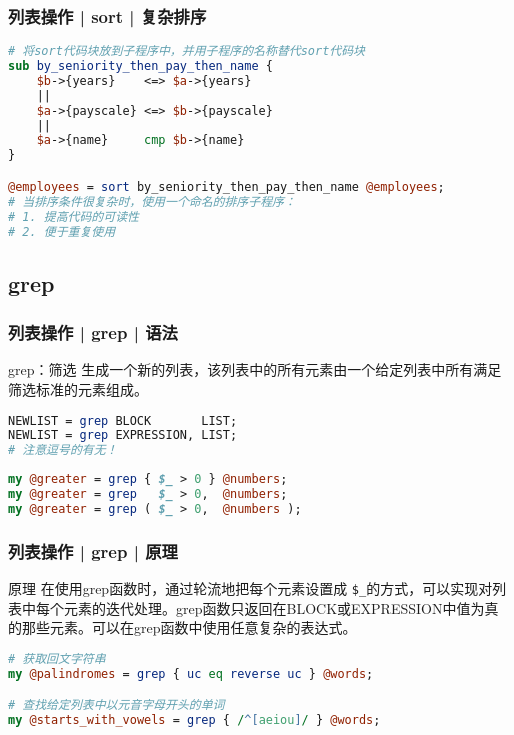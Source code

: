 \begin{frame}[fragile]
  \frametitle{列表操作 | sort | 复杂排序}
  \vspace{-1.5em}
\begin{lstlisting}[language=Perl]
# 将sort代码块放到子程序中，并用子程序的名称替代sort代码块
sub by_seniority_then_pay_then_name {
    $b->{years}    <=> $a->{years}
    ||
    $a->{payscale} <=> $b->{payscale}
    ||
    $a->{name}     cmp $b->{name}
}

@employees = sort by_seniority_then_pay_then_name @employees;
# 当排序条件很复杂时，使用一个命名的排序子程序：
# 1. 提高代码的可读性
# 2. 便于重复使用
\end{lstlisting}
\end{frame}

\subsection{grep}
\begin{frame}[fragile]
  \frametitle{列表操作 | grep | \alert{语法}}
  \begin{block}{grep：筛选}
    生成一个新的列表，该列表中的所有元素由一个给定列表中所有满足筛选标准的元素组成。 
  \end{block}
  \vspace{-1.5em}
\begin{lstlisting}[language=Perl]
NEWLIST = grep BLOCK       LIST;
NEWLIST = grep EXPRESSION, LIST;
# 注意逗号的有无！
\end{lstlisting}
\pause
\begin{lstlisting}[language=Perl]
my @greater = grep { $_ > 0 } @numbers;
my @greater = grep   $_ > 0,  @numbers;
my @greater = grep ( $_ > 0,  @numbers );
\end{lstlisting}
\end{frame}

\begin{frame}[fragile]
  \frametitle{列表操作 | grep | 原理}
  \begin{block}{原理}
    在使用grep函数时，通过轮流地把每个元素设置成 \verb|$_|的方式，可以实现对列表中每个元素的迭代处理。grep函数只返回在BLOCK或EXPRESSION中值为真的那些元素。可以在grep函数中使用任意复杂的表达式。
  \end{block}
  \vspace{-1.5em}
\begin{lstlisting}[language=Perl]
# 获取回文字符串
my @palindromes = grep { uc eq reverse uc } @words;

# 查找给定列表中以元音字母开头的单词
my @starts_with_vowels = grep { /^[aeiou]/ } @words;
\end{lstlisting}
\end{frame}


